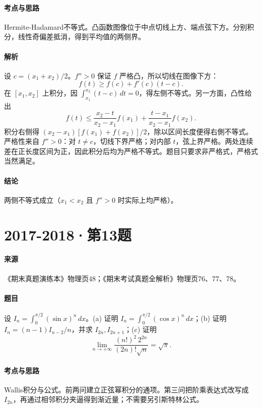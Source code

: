 \documentclass[UTF8,fontset=fandol,12pt,oneside,openany]{ctexrep}
\theoremstyle{definition}
\begin{document}
\paragraph{考点与思路}
Hermite-Hadamard不等式。凸函数图像位于中点切线上方、端点弦下方。分别积分，线性奇偏差抵消，得到平均值的两侧界。
\paragraph{解析}
设 $c=(x_1+x_2)/2$。$f''>0$ 保证 $f$ 严格凸，所以切线在图像下方：
\[f(t)\ge f(c)+f'(c)(t-c).\]
在 $[x_1,x_2]$ 上积分，因 $\int_{x_1}^{x_2}(t-c)\,dt=0$，得左侧不等式。另一方面，凸性给出
\[f(t)\le\frac{x_2-t}{x_2-x_1}f(x_1)+\frac{t-x_1}{x_2-x_1}f(x_2).\]
积分右侧得 $(x_2-x_1)[f(x_1)+f(x_2)]/2$，除以区间长度便得右側不等式。
严格性来自 $f''>0$：对 $t\ne c$，切线下界严格；对内部 $t$，弦上界严格。两处连续差在正长度区间为正，因此积分后均为严格不等式。题目只要求非严格式，严格式当然满足。
\paragraph{结论}
两侧不等式成立（$x_1<x_2$ 且 $f''>0$ 时实际上均严格）。

\par\addvspace{18pt}\noindent\begin{minipage}{\linewidth}
\section{2017-2018·第13题}
\label{exam:11:q25}
\paragraph{来源} 《期末真题演练本》物理页48；《期末考试真题全解析》物理页76、77、78。
\paragraph{题目}
设 $I_n=\int_0^{\pi/2}(\sin x)^n\,dx$。(a) 证明 $I_n=\int_0^{\pi/2}(\cos x)^n\,dx$；(b) 证明 $I_n=(n-1)I_{n-2}/n$，并求 $I_{2n},I_{2n+1}$；(c) 证明
\[\lim_{n\to+\infty}\frac{(n!)^2\,2^{2n}}{(2n)!\sqrt n}=\sqrt\pi.\]
\end{minipage}\par
\paragraph{考点与思路}
Wallis积分与公式。前两问建立正弦幂积分的通项。第三问把阶乘表达式改写成 $I_{2n}$，再通过相邻积分夹逼得到渐近量；不需要另引斯特林公式。
\end{document}
